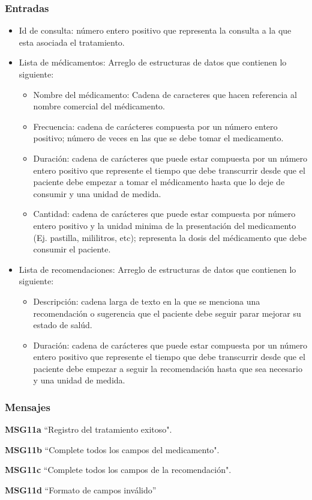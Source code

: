 \subsubsection{Entradas}
    \begin{itemize}
      \item Id de consulta: número entero positivo que representa la consulta a la que esta asociada el tratamiento.
      \item Lista de médicamentos: Arreglo de estructuras de datos que contienen lo siguiente:
        \begin{itemize}
          \item Nombre del médicamento: Cadena de caracteres que hacen referencia al nombre comercial del médicamento.
          \item Frecuencia: cadena de carácteres compuesta por un número entero positivo; número de veces en las que se debe tomar el medicamento.
          \item Duración: cadena de carácteres que puede estar compuesta por un número entero positivo que represente el tiempo que debe transcurrir desde que el paciente debe empezar a tomar el médicamento hasta que lo deje de consumir y una unidad de medida. 
          \item Cantidad: cadena de carácteres que puede estar compuesta por número entero positivo y la unidad minima de la presentación del medicamento (Ej. pastilla, mililitros, etc); representa la dosis del médicamento que debe consumir el paciente.

        \end{itemize}   
      \item Lista de recomendaciones: Arreglo de estructuras de datos que contienen lo siguiente:
        \begin{itemize}
          \item Descripción: cadena larga de texto en la que se menciona una recomendación o sugerencia que el paciente debe seguir parar mejorar su estado de salúd.
          \item Duración: cadena de carácteres que puede estar compuesta por un número entero positivo que represente el tiempo que debe transcurrir desde que el paciente debe empezar a seguir la recomendación hasta que sea necesario y una unidad de medida. 
        \end{itemize}   
    \end{itemize}

\subsubsection{Mensajes}
    \begin{Citemize}
        \item {\bf MSG11a} ``Registro del tratamiento exitoso".
      	\item {\bf MSG11b} ``Complete todos los campos del medicamento".
      	\item {\bf MSG11c} ``Complete todos los campos de la recomendación".
      	\item {\bf MSG11d} ``Formato de campos inválido''
    \end{Citemize}

